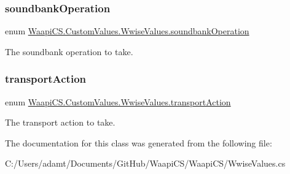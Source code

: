 \subsubsection{\texorpdfstring{soundbank\+Operation}{soundbankOperation}}
{\footnotesize\ttfamily enum \mbox{\hyperlink{class_waapi_c_s_1_1_custom_values_1_1_wwise_values_a1b0c0844c7d8ac428022c97feeec0b5f}{Waapi\+C\+S.\+Custom\+Values.\+Wwise\+Values.\+soundbank\+Operation}}\hspace{0.3cm}{\ttfamily [strong]}}



The soundbank operation to take. 

\mbox{\label{class_waapi_c_s_1_1_custom_values_1_1_wwise_values_abe08eb4038ce656dcf1f451b78a35983}} 
\subsubsection{\texorpdfstring{transport\+Action}{transportAction}}
{\footnotesize\ttfamily enum \mbox{\hyperlink{class_waapi_c_s_1_1_custom_values_1_1_wwise_values_abe08eb4038ce656dcf1f451b78a35983}{Waapi\+C\+S.\+Custom\+Values.\+Wwise\+Values.\+transport\+Action}}\hspace{0.3cm}{\ttfamily [strong]}}



The transport action to take. 



The documentation for this class was generated from the following file\+:\begin{DoxyCompactItemize}
\item 
C\+:/\+Users/adamt/\+Documents/\+Git\+Hub/\+Waapi\+C\+S/\+Waapi\+C\+S/Wwise\+Values.\+cs\end{DoxyCompactItemize}

